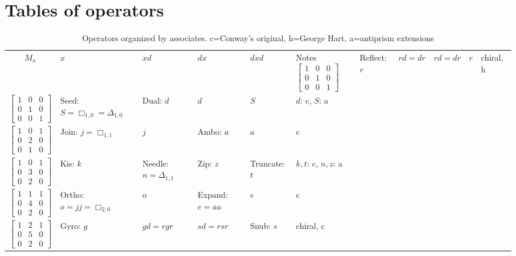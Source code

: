 \documentclass{amsart}[12pt]
\begin{document}
\section{Tables of operators}
\begin{longtable}{c|p{2cm}|p{2cm}|p{2cm}|p{2cm}|p{3cm}}
    \caption{Operators organized by associates. c=Conway's original, h=George
    Hart, a=antiprism extensions}\\
    $M_x$ & $x$  & $xd$ & $dx$ & $dxd$ & Notes
    \endhead \hline
    $\begin{bmatrix}
    1 & 0 & 0 \\
    0 & 1 & 0 \\
    0 & 0 & 1 \end{bmatrix}$& Reflect: $r$ & $rd=dr$ & $rd=dr$ & $r$ & chiral, h
    \\
    $\begin{bmatrix}
    1 & 0 & 0 \\
    0 & 1 & 0 \\
    0 & 0 & 1 \end{bmatrix}$& Seed: $S=\Box_{1,0} =\Delta_{1,0}$ & Dual: $d$ & $d$ & $S$ & $d$: c, $S$: a
    \\
    $\begin{bmatrix}
    1 & 0 & 1 \\
    0 & 2 & 0 \\
    0 & 1 & 0 \end{bmatrix}$& Join: $j=\Box_{1,1}$ & $j$ & Ambo: $a$ & $a$ & c
    \\
    $\begin{bmatrix}
    1 & 0 & 1 \\
    0 & 3 & 0 \\
    0 & 2 & 0 \end{bmatrix}$& Kis: $k$ & Needle: $n =\Delta_{1,1}$ & Zip: $z$ & Truncate: $t$ & $k, t$: c, $n, z$: a
    \\
    $\begin{bmatrix}
    1 & 1 & 1 \\
    0 & 4 & 0 \\
    0 & 2 & 0 \end{bmatrix}$& Ortho: $o=jj=\Box_{2,0}$ & $o$ & Expand: $e=aa$ & $e$ & c
    \\
    $\begin{bmatrix}
    1 & 2 & 1 \\
    0 & 5 & 0 \\
    0 & 2 & 0 \end{bmatrix}$& Gyro: $g$ & $gd=rgr$ & $sd=rsr$ & Snub: $s$ & chiral, c
    \\

\end{longtable}
\end{document}
